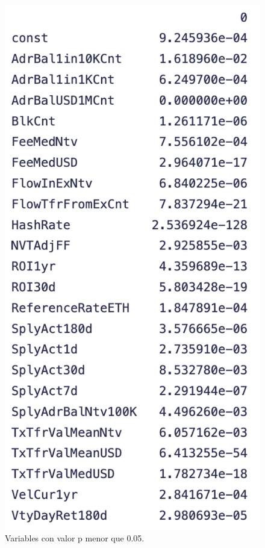 \begin{figure}
	\centering
	\includegraphics[scale=0.5]{Chapter5/p-val.png}
	\caption{Variables con valor p menor que 0.05.}
	\label{fig11}
\end{figure}

